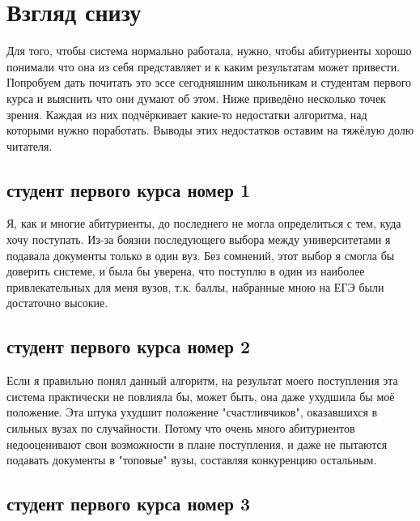 \documentclass[pdftex, 11pt, a4paper]{article}
\begin{document}
\section{Взгляд снизу} 

Для того, чтобы система нормально работала, нужно, чтобы абитуриенты хорошо понимали что она из себя представляет и к каким результатам может привести. Попробуем дать почитать это эссе сегодняшним школьникам и студентам первого курса и выяснить что они думают об этом. Ниже приведёно несколько точек зрения. Каждая из них подчёркивает какие-то недостатки алгоритма, над которыми нужно поработать. Выводы этих недостатков оставим на тяжёлую долю читателя.


\subsection{студент первого курса номер 1}

Я, как и многие абитуриенты, до последнего не могла определиться с тем, куда хочу поступать. Из-за боязни последующего выбора между университетами я подавала документы только в один вуз. Без сомнений, этот выбор я смогла бы доверить системе, и была бы уверена, что поступлю в один из наиболее привлекательных для меня вузов, т.к. баллы, набранные мною на ЕГЭ были достаточно высокие.

\subsection{студент первого курса номер 2}

Если я правильно понял данный алгоритм, на результат моего поступления эта система практически не повлияла бы, может быть, она даже ухудшила бы моё положение. Эта штука ухудшит положение "счастливчиков", оказавшихся в сильных вузах по случайности. Потому что очень много абитуриентов недооценивают свои возможности в плане поступления, и даже не пытаются подавать документы в "топовые" вузы, составляя конкуренцию остальным.

\subsection{студент первого курса номер 3}
\end{document}
